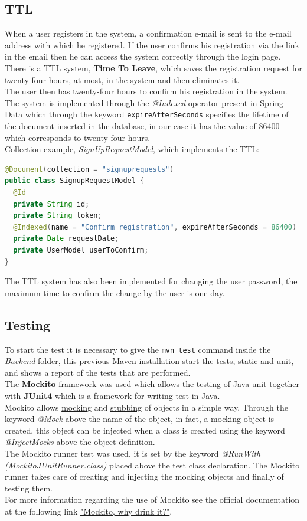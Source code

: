 \subsection{TTL}
\label{sec:TTL}
When a user registers in the system, a confirmation e-mail is sent to the e-mail address with which he registered. If the user confirms his registration via the link in the email then he can access the system correctly through the login page.\\
There is a TTL system, \textbf{Time To Leave}, which saves the registration request for twenty-four hours, at most, in the system and then eliminates it.\\
The user then has twenty-four hours to confirm his registration in the system.\\
The system is implemented through the \textit{@Indexed} operator present in Spring Data which through the keyword \texttt{expireAfterSeconds} specifies the lifetime of the document inserted in the database, in our case it has the value of 86400 which corresponds to twenty-four hours.\\
Collection example, \textit{SignUpRequestModel}, which implements the TTL: 
\begin{lstlisting}[language=Java]
@Document(collection = "signuprequests")
public class SignupRequestModel {
  @Id
  private String id;
  private String token;
  @Indexed(name = "Confirm registration", expireAfterSeconds = 86400)
  private Date requestDate;
  private UserModel userToConfirm;
}
\end{lstlisting}
The TTL system has also been implemented for changing the user password, the maximum time to confirm the change by the user is one day.



\subsection{Testing}	
To start the test it is necessary to give the \texttt{mvn test} command 	inside the \textit{Backend} folder, this previous Maven installation start the tests, static and unit, and shows a report of the tests that are performed.\\
The \textbf{Mockito} framework was used which allows the testing of Java unit together with \textbf{JUnit4} which is a framework for writing test in Java.\\
Mockito allows \href{https://en.wikipedia.org/wiki/Mock_object}{mocking} and \href{https://en.wikipedia.org/wiki/Method_stub}{stubbing} of objects  in a simple way. Through the keyword \textit{@Mock} above the name of the object, in fact, a mocking object is created, this object can be injected when a class is created using the keyword \textit{@InjectMocks} above the object definition.\\
The Mockito runner test was used, it is set by the keyword \textit{@RunWith (MockitoJUnitRunner.class)} placed above the test class declaration.
The Mockito runner takes care of creating and injecting the mocking objects and finally of testing them.\\
For more information regarding the use of Mockito see the official documentation at the following link \href{https://site.mockito.org/}{"Mockito, why drink it?"}.

